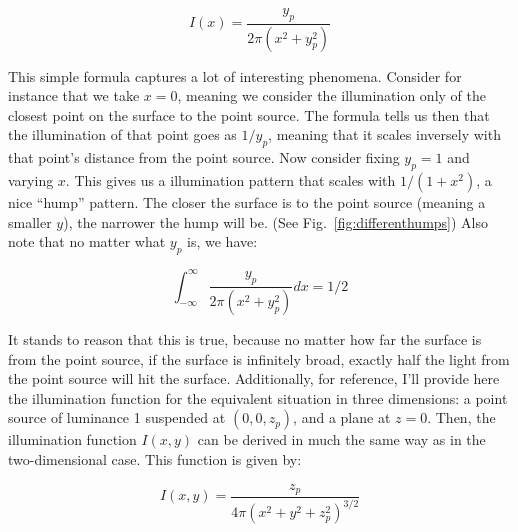    $$I(x) = \frac{y_p}{2\pi(x^2 + y_p^2)}$$
    
    This simple formula captures a lot of interesting phenomena. Consider for instance that we take $x = 0$, meaning we consider the illumination only of the closest point on the surface to the point source. The formula tells us then that the illumination of that point goes as $1/y_p$, meaning that it scales inversely with that point's distance from the point source. Now consider fixing $y_p = 1$ and varying $x$. This gives us a illumination pattern that scales with $1/(1+x^2)$, a nice ``hump'' pattern. The closer the surface is to the point source (meaning a smaller $y$), the narrower the hump will be. (See Fig.~\ref{fig:differenthumps}) Also note that no matter what $y_p$ is, we have:
    
    
$$\int_{-\infty}^\infty \frac{y_p}{2\pi(x^2 + y_p^2)} dx = 1/2$$

It stands to reason that this is true, because no matter how far the surface is from the point source, if the surface is infinitely broad, exactly half the light from the point source will hit the surface. Additionally, for reference, I'll provide here the illumination function for the equivalent situation in three dimensions: a point source of luminance 1 suspended at $(0, 0, z_p)$, and a plane at $z=0$. Then, the illumination function $I(x, y)$ can be derived in much the same way as in the two-dimensional case. This function is given by:

$$I(x, y) = \frac{z_p}{4\pi(x^2 + y^2 + z_p^2)^{3/2}}$$

